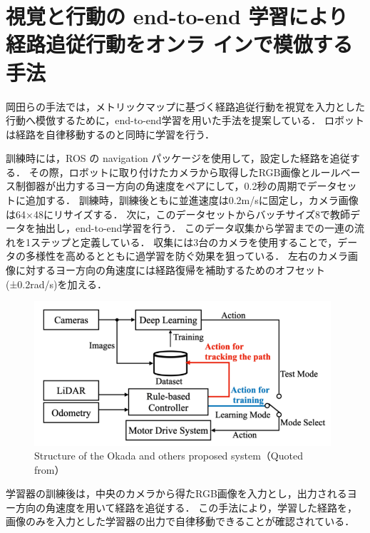 \section{視覚と行動の end-to-end 学習により経路追従行動をオンラ
インで模倣する手法}
岡田らの手法では，メトリックマップに基づく経路追従行動を視覚を入力とした行動へ模倣するために，end-to-end学習を用いた手法を提案している．
ロボットは経路を自律移動するのと同時に学習を行う．

訓練時には，ROS の navigation パッケージを使用して，設定した経路を追従する．
その際，ロボットに取り付けたカメラから取得したRGB画像とルールベース制御器が出力するヨー方向の角速度をペアにして，0.2秒の周期でデータセットに追加する．
訓練時，訓練後ともに並進速度は0.2m/sに固定し，カメラ画像は64×48にリサイズする．
次に，このデータセットからバッチサイズ8で教師データを抽出し，end-to-end学習を行う．
このデータ収集から学習までの一連の流れを1ステップと定義している．
収集には3台のカメラを使用することで，データの多様性を高めるとともに過学習を防ぐ効果を狙っている．
左右のカメラ画像に対するヨー方向の角速度には経路復帰を補助するためのオフセット(±0.2rad/s)を加える．

\clearpage
\begin{figure}[htbp]
  \centering
   \includegraphics[width=110mm]{images/pdf/okada/method_sys.pdf}
   \caption[Structure of the Okada and others proposed system]{Structure of the Okada and others proposed system（Quoted from\cite{okada2020}）}
   \label{fig:okada_sys}
\end{figure}

学習器の訓練後は，中央のカメラから得たRGB画像を入力とし，出力されるヨー方向の角速度を用いて経路を追従する．
この手法により，学習した経路を，画像のみを入力とした学習器の出力で自律移動できることが確認されている．